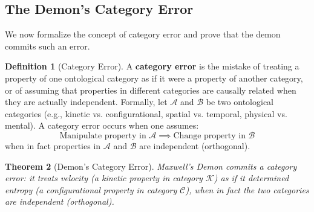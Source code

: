 \documentclass[12pt,a4paper]{article}
\newtheorem{theorem}{Theorem}[section]
\theoremstyle{definition}
\newtheorem{definition}[theorem]{Definition}
\theoremstyle{remark}
\begin{document}
\subsection{The Demon's Category Error}

We now formalize the concept of category error and prove that the demon commits such an error.

\begin{definition}[Category Error]
\label{def:category_error}
A \textbf{category error} is the mistake of treating a property of one ontological category as if it were a property of another category, or of assuming that properties in different categories are causally related when they are actually independent. Formally, let $\mathcal{A}$ and $\mathcal{B}$ be two ontological categories (e.g., kinetic vs. configurational, spatial vs. temporal, physical vs. mental). A category error occurs when one assumes:
\begin{equation}
\text{Manipulate property in } \mathcal{A} \implies \text{Change property in } \mathcal{B}
\end{equation}
when in fact properties in $\mathcal{A}$ and $\mathcal{B}$ are independent (orthogonal).
\end{definition}

\begin{theorem}[Demon's Category Error]
\label{thm:category_error}
Maxwell's Demon commits a category error: it treats velocity (a kinetic property in category $\mathcal{K}$) as if it determined entropy (a configurational property in category $\mathcal{C}$), when in fact the two categories are independent (orthogonal).
\end{theorem}
\end{document}
